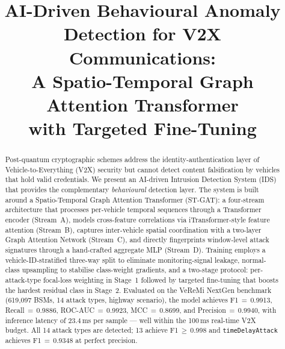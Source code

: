 \documentclass[conference]{IEEEtran}
\begin{document}
\title{AI-Driven Behavioural Anomaly Detection for V2X Communications:\\
A Spatio-Temporal Graph Attention Transformer\\with Targeted Fine-Tuning}

\author{
}

\maketitle

\begin{abstract}
Post-quantum cryptographic schemes address the identity-authentication
layer of Vehicle-to-Everything (V2X) security but cannot detect content
falsification by vehicles that hold valid credentials.  We present an
AI-driven Intrusion Detection System (IDS) that provides the complementary
\emph{behavioural} detection layer.  The system is built around a
Spatio-Temporal Graph Attention Transformer (ST-GAT): a four-stream
architecture that processes per-vehicle temporal sequences through a
Transformer encoder (Stream~A), models cross-feature correlations via
iTransformer-style feature attention (Stream~B), captures inter-vehicle
spatial coordination with a two-layer Graph Attention Network (Stream~C),
and directly fingerprints window-level attack signatures through a
hand-crafted aggregate MLP (Stream~D).  Training employs a
vehicle-ID-stratified three-way split to eliminate monitoring-signal
leakage, normal-class upsampling to stabilise class-weight gradients, and
a two-stage protocol: per-attack-type focal-loss weighting in Stage~1
followed by targeted fine-tuning that boosts the hardest residual class
in Stage~2.  Evaluated on the VeReMi NextGen benchmark (619,097 BSMs,
14 attack types, highway scenario), the model achieves
F1\,$=$\,0.9913, Recall\,$=$\,0.9886, ROC-AUC\,$=$\,0.9923,
MCC\,$=$\,0.8699, and Precision\,$=$\,0.9940, with inference latency of
23.4\,ms per sample --- well within the 100\,ms real-time V2X budget.
All 14 attack types are detected; 13 achieve F1\,$\geq\,$0.998 and
\texttt{timeDelayAttack} achieves F1\,$=$\,0.9348 at perfect precision.
\end{abstract}
\end{document}
